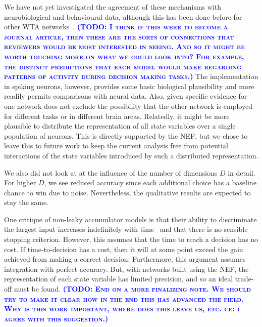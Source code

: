 \documentclass[10pt,letterpaper]{article}
\makeatletter
\newcommand{\todo}[1]{\textbf{\textsc{\textcolor{blue}{(TODO\@: #1)}}}}
\makeatother
\begin{document}

We have not yet investigated the agreement of these mechanisms with neurobiological and behavioural data, although this has been done before for other WTA networks~\cite{gold2007,smith2004}.
\todo{I think if this were to become a journal article, then these are the sorts of connections that reviewers would be most interested in seeing. And so it might be worth touching more on what we could look into? For example, the distinct predictions that each model would make regarding patterns of activity during decision making tasks.}
The implementation in spiking neurons, however, provides some basic biological plausibility and more readily permits comparisons with neural data.
Also, given specific evidence for one network does not exclude the possibility that the other network is employed for different tasks or in different brain areas.
Relatedly, it might be more plausible to distribute the representation of all state variables over a single population of neurons.
This is directly supported by the NEF, but we chose to leave this to future work to keep the current analysis free from potential interactions of the state variables introduced by such a distributed representation.

We also did not look at at the influence of the number of dimensions $D$ in detail.
For higher $D$, we see reduced accuracy since each additional choice has a baseline chance to win due to noise.
Nevertheless, the qualitative results are expected to stay the same.

One critique of non-leaky accumulator models is that their ability to discriminate the largest input increases indefinitely with time~\cite{usher2001} and that there is no sensible stopping criterion.
However, this assumes that the time to reach a decision has no cost.
If time-to-decision has a cost, then it will at some point exceed the gain achieved from making a correct decision.
Furthermore, this argument assumes integration with perfect accuracy.
But, with networks built using the NEF, the representation of each state variable has limited precision, and so an ideal trade-off must be found.
\todo{End on a more finalizing note. We should try to make it clear how in the end this has advanced the field. Why is this work important, where does this leave us, etc. ce: i agree with this suggestion.}
\end{document}
